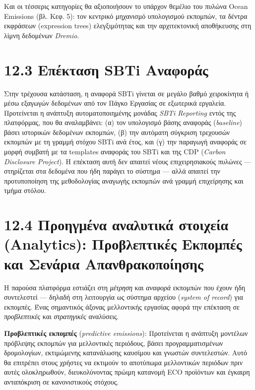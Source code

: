 \documentclass[11pt,a4paper,greek,twoside]{template-xe}
\begin{document}
Και οι τέσσερις κατηγορίες θα αξιοποιήσουν το υπάρχον θεμέλιο του πυλώνα
Ocean Emissions (βλ. Κεφ. 5): τον κεντρικό μηχανισμό υπολογισμού
εκπομπών, τα δέντρα εκφράσεων (expression trees) ελεγξιμότητας και την
αρχιτεκτονική αποθήκευσης στη λίμνη δεδομένων \emph{Dremio}.

\section{12.3 Επέκταση SBTi
Αναφοράς}\label{ux3b5ux3c0ux3adux3baux3c4ux3b1ux3c3ux3b7-sbti-ux3b1ux3bdux3b1ux3c6ux3bfux3c1ux3acux3c2}

Στην τρέχουσα κατάσταση, η αναφορά SBTi γίνεται σε μεγάλο βαθμό
χειροκίνητα ή μέσω εξαγωγών δεδομένων από τον Πάγκο Εργασίας σε
εξωτερικά εργαλεία. Προτείνεται η ανάπτυξη αυτοματοποιημένης μονάδας
\emph{SBTi Reporting} εντός της πλατφόρμας, που θα αναλαμβάνει: (α) τον
υπολογισμό βάσης αναφοράς (\emph{baseline}) βάσει ιστορικών δεδομένων
εκπομπών, (β) την αυτόματη σύγκριση τρεχουσών εκπομπών με τη γραμμή
στόχου SBTi ανά έτος, και (γ) την παραγωγή αναφοράς σε μορφή συμβατή με
τα templates αναφοράς του SBTi και της CDP (\emph{Carbon Disclosure
Project}). Η επέκταση αυτή δεν απαιτεί νέους επιχειρησιακούς πυλώνες ---
στηρίζεται στα δεδομένα που ήδη παράγει το σύστημα --- αλλά απαιτεί την
προτυποποίηση της μεθοδολογίας αναγωγής εκπομπών ανά γραμμή επιχείρησης
και τμήμα στόλου.

\section{12.4 Προηγμένα αναλυτικά στοιχεία (Analytics): Προβλεπτικές
Εκπομπές και Σενάρια
Απανθρακοποίησης}\label{ux3c0ux3c1ux3bfux3b7ux3b3ux3bcux3adux3bdux3b1-ux3b1ux3bdux3b1ux3bbux3c5ux3c4ux3b9ux3baux3ac-ux3c3ux3c4ux3bfux3b9ux3c7ux3b5ux3afux3b1-analytics-ux3c0ux3c1ux3bfux3b2ux3bbux3b5ux3c0ux3c4ux3b9ux3baux3adux3c2-ux3b5ux3baux3c0ux3bfux3bcux3c0ux3adux3c2-ux3baux3b1ux3b9-ux3c3ux3b5ux3bdux3acux3c1ux3b9ux3b1-ux3b1ux3c0ux3b1ux3bdux3b8ux3c1ux3b1ux3baux3bfux3c0ux3bfux3afux3b7ux3c3ux3b7ux3c2}

Η παρούσα πλατφόρμα εστιάζει στη \emph{μέτρηση} και \emph{αναφορά}
εκπομπών που έχουν ήδη συντελεστεί --- δηλαδή στη λειτουργία ως σύστημα
αρχείου (\emph{system of record}) για εκπομπές. Ένας σημαντικός άξονας
μελλοντικής εργασίας αφορά την επέκταση σε \emph{προβλεπτικές} και
\emph{στρατηγικές} αναλύσεις.

\textbf{Προβλεπτικές εκπομπές} (\emph{predictive emissions}):
Προτείνεται η ανάπτυξη μοντέλων πρόβλεψης εκπομπών για μελλοντικές
περιόδους, βάσει προγραμματισμένων δρομολογίων, εκτιμώμενης κατανάλωσης
καυσίμου και γνωστών συντελεστών. Αυτό θα επιτρέπει στους χρήστες να
εκτιμούν το αποτύπωμα μελλοντικών περιόδων πριν αυτές ολοκληρωθούν,
διευκολύνοντας πρώιμη κατανομή ECO προϊόντων και έγκαιρη ανταπόκριση σε
κανονιστικούς στόχους.
\end{document}
